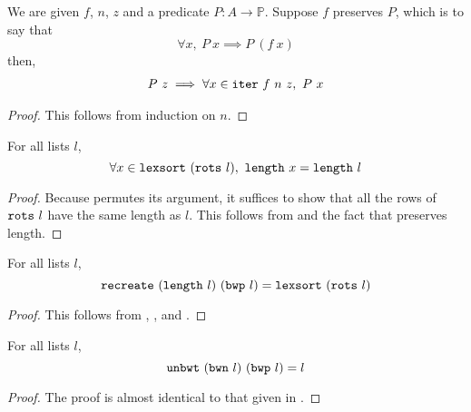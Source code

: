 \documentclass[11pt]{thesis}
\begin{document}
\begin{theorem}
  We are given $f$, $n$, $z$ and a predicate $P : A \to \mathbb{P}$.
  Suppose $f$ preserves $P$, which is to say that
  \begin{equation*}
    \forall x,~P~x \implies P~(f~x)
  \end{equation*}
  then,
  \begin{gather*}
     P~z \implies \forall x \in \texttt{iter}~f~n~z,~P~x
  \end{gather*}
\end{theorem}
\begin{proof}
  This follows from induction on $n$.
\end{proof}

\begin{lemma}
  For all lists $l$,
  \begin{equation*}
    \forall x \in \texttt{lexsort}~(\texttt{rots}~l),~\texttt{length}~x = \texttt{length}~l
  \end{equation*}
\end{lemma}
\begin{proof}
  Because  permutes its argument, it suffices to show
  that all the rows of $\texttt{rots}~l$ have the same length as $l$.
  This follows from  and the fact that
   preserves length.
\end{proof}

\begin{corollary}
  For all lists $l$,
  \begin{equation*}
    \texttt{recreate}~(\texttt{length}~l)~(\texttt{bwp}~l) =
    \texttt{lexsort}~(\texttt{rots}~l)
  \end{equation*}
\end{corollary}
\begin{proof}
  This follows from ,
  , and .
\end{proof}

\begin{theorem}
  For all lists $l$,
  \begin{equation*}
    \texttt{unbwt}~(\texttt{bwn}~l)~(\texttt{bwp}~l) = l
  \end{equation*}
\end{theorem}
\begin{proof}
  The proof is almost identical to that given in
  .
\end{proof}
\end{document}
